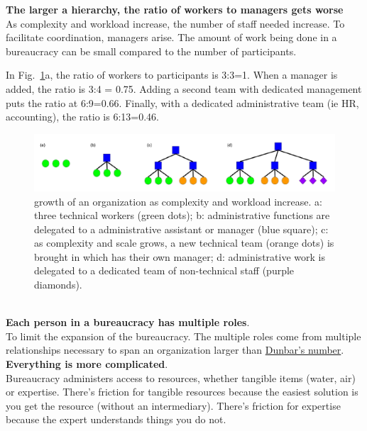 \textbf{The larger a hierarchy, the ratio of workers to managers gets worse} \\

As complexity and workload increase, the number of staff needed increase. To facilitate coordination, managers arise. The amount of work being done in a bureaucracy can be small compared to the number of participants.

In Fig.~\ref{fig:growth_of_bureaucracy}a, the ratio of workers to participants is 3:3=1. When a manager is added, the ratio is 3:4 = 0.75. Adding a second team with dedicated management puts the ratio at 6:9=0.66. Finally, with a dedicated administrative team (ie HR, accounting), the ratio is 6:13=0.46.

    \begin{figure}
        \centering
        \includegraphics[width=1\textwidth]{images/growth-of-bureaucracy.pdf}
        \caption{growth of an organization as complexity and workload increase. a: three technical workers (green dots); b: administrative functions are delegated to a administrative assistant or manager (blue square); c: as complexity and scale grows, a new technical team (orange dots) is brought in which has their own manager; d: administrative work is delegated to a dedicated team of non-technical staff (purple diamonds).}
        \label{fig:growth_of_bureaucracy}
    \end{figure}

\ \\

\textbf{Each person in a bureaucracy has multiple roles}.\\
To limit the expansion of the bureaucracy. The multiple roles come from multiple relationships necessary to span an organization larger than \href{https://en.wikipedia.org/wiki/Dunbar\%27s_number}{Dunbar's number}. 
\ \\

\textbf{Everything is more complicated}. \\
Bureaucracy administers access to resources, whether tangible items (water, air) or expertise. There's friction for tangible resources because the easiest solution is you get the resource (without an intermediary). There's friction for expertise because the expert understands things you do not. 

